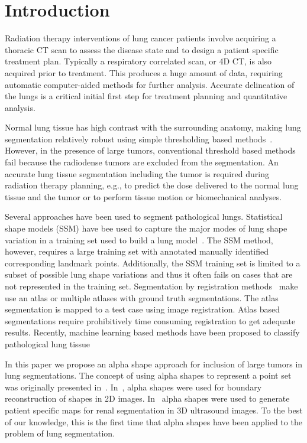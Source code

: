 \documentclass{llncs}
\begin{document}
\section{Introduction}
%
Radiation therapy interventions of lung cancer patients involve acquiring a thoracic CT scan to assess the disease state and to design a patient specific treatment plan. Typically a respiratory correlated scan, or 4D CT, is also acquired prior to treatment. This produces a huge amount of data, requiring automatic computer-aided methods for further analysis. Accurate delineation of the lungs is a critical initial first step for treatment planning and quantitative analysis.

Normal lung tissue has high contrast with the surrounding anatomy, making lung segmentation relatively robust using simple thresholding based methods~\cite{guo2008,hu2001}. However, in the presence of large tumors, conventional threshold based methods fail because the radiodense tumors are excluded from the segmentation. An accurate lung tissue segmentation including the tumor is required during radiation therapy planning, e.g., to predict the dose delivered to the normal lung tissue and the tumor or to perform tissue motion or biomechanical analyses.

Several approaches have been used to segment pathological lungs. Statistical shape models (SSM) have bee used to capture the major modes of lung shape variation in a training set used to build a lung model~\cite{sofka2011,sun2012}. The SSM method, however, requires a large training set with annotated manually identified corresponding landmark points. Additionally, the SSM training set is limited to a subset of possible lung shape variations and thus it often fails on cases that are not represented in the training set. Segmentation by registration methods~\cite{sluimer2005,vanrikxoort2009} make use an atlas or multiple atlases with ground truth segmentations. The atlas segmentation is mapped to a test case using image registration. Atlas based segmentations require prohibitively time consuming registration to get adequate results. Recently, machine learning based methods have been proposed to classify pathological lung tissue~\cite{mansoor2014,song2012}

In this paper we propose an alpha shape approach for inclusion of large tumors in lung segmentations. The concept of using alpha shapes to represent a point set was originally presented in~\cite{edelsbrunner1983}. In~\cite{stelldinger2006}, alpha shapes were used for boundary reconstruction of shapes in 2D images. In~\cite{cerrolaza2015} alpha shapes were used to generate patient specific maps for renal segmentation in 3D ultrasound images. To the best of our knowledge, this is the first time that alpha shapes have been applied to the problem of lung segmentation. 
\end{document}
